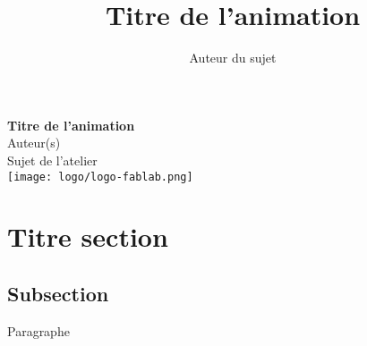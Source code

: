 \documentclass{animation-fablab}
\title{Titre de l'animation}
\author{Auteur du sujet}
\begin{document}
  \begin{titlepage}
    \centering
    \vfill
    {\bfseries \Huge
        Titre de l'animation \\
    }
    {\huge
        Auteur(s)\\
        \vskip2cm
        Sujet de l'atelier\\
    }
    \vfill
    \texttt{[image: logo/logo-fablab.png]}
    \vfill
    \vfill
  \end{titlepage}

  \newpage

  \section{Titre section}
  \subsection{Subsection}
  {Paragraphe}
\end{document}
